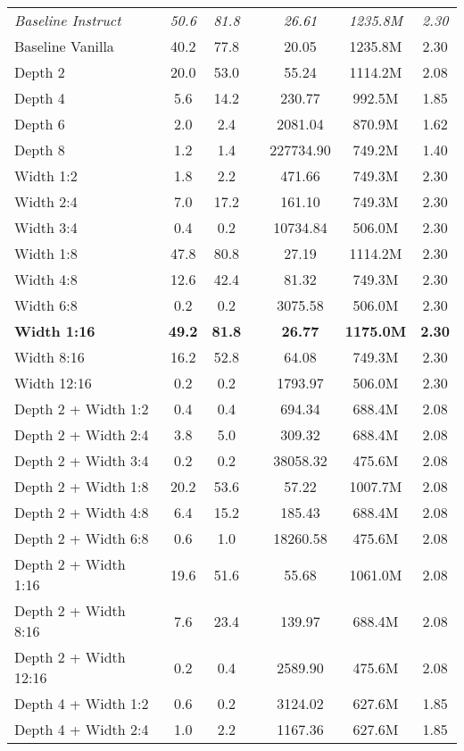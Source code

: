 {\begin{longtable}{lcccccc}
\textit{Baseline Instruct} & \textit{50.6} & \textit{81.8} & & \textit{26.61} & \textit{1235.8M} & \textit{2.30} \\
Baseline Vanilla & 40.2 & 77.8 & & 20.05 & 1235.8M & 2.30 \\
Depth 2 & 20.0 & 53.0 & & 55.24 & 1114.2M & 2.08 \\
Depth 4 & 5.6 & 14.2 & & 230.77 & 992.5M & 1.85 \\
Depth 6 & 2.0 & 2.4 & & 2081.04 & 870.9M & 1.62 \\
Depth 8 & 1.2 & 1.4 & & 227734.90 & 749.2M & 1.40 \\
Width 1:2 & 1.8 & 2.2 & & 471.66 & 749.3M & 2.30 \\
Width 2:4 & 7.0 & 17.2 & & 161.10 & 749.3M & 2.30 \\
Width 3:4 & 0.4 & 0.2 & & 10734.84 & 506.0M & 2.30 \\
Width 1:8 & 47.8 & 80.8 & & 27.19 & 1114.2M & 2.30 \\
Width 4:8 & 12.6 & 42.4 & & 81.32 & 749.3M & 2.30 \\
Width 6:8 & 0.2 & 0.2 & & 3075.58 & 506.0M & 2.30 \\
\textbf{Width 1:16} & \textbf{49.2} & \textbf{81.8} & & \textbf{26.77} & \textbf{1175.0M} & \textbf{2.30} \\
Width 8:16 & 16.2 & 52.8 & & 64.08 & 749.3M & 2.30 \\
Width 12:16 & 0.2 & 0.2 & & 1793.97 & 506.0M & 2.30 \\
Depth 2 + Width 1:2 & 0.4 & 0.4 & & 694.34 & 688.4M & 2.08 \\
Depth 2 + Width 2:4 & 3.8 & 5.0 & & 309.32 & 688.4M & 2.08 \\
Depth 2 + Width 3:4 & 0.2 & 0.2 & & 38058.32 & 475.6M & 2.08 \\
Depth 2 + Width 1:8 & 20.2 & 53.6 & & 57.22 & 1007.7M & 2.08 \\
Depth 2 + Width 4:8 & 6.4 & 15.2 & & 185.43 & 688.4M & 2.08 \\
Depth 2 + Width 6:8 & 0.6 & 1.0 & & 18260.58 & 475.6M & 2.08 \\
Depth 2 + Width 1:16 & 19.6 & 51.6 & & 55.68 & 1061.0M & 2.08 \\
Depth 2 + Width 8:16 & 7.6 & 23.4 & & 139.97 & 688.4M & 2.08 \\
Depth 2 + Width 12:16 & 0.2 & 0.4 & & 2589.90 & 475.6M & 2.08 \\
Depth 4 + Width 1:2 & 0.6 & 0.2 & & 3124.02 & 627.6M & 1.85 \\
Depth 4 + Width 2:4 & 1.0 & 2.2 & & 1167.36 & 627.6M & 1.85 \\

\end{longtable}}
